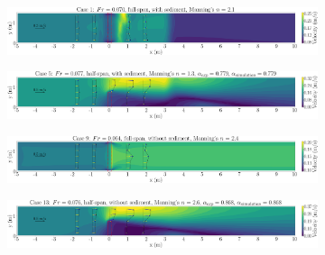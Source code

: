 \documentclass[preview, border=2pt]{standalone}
\begin{document}
\begin{figure}
     \centering
     \begin{subfigure}[b]{0.95\textwidth}
         \centering
         \caption{}
         \includegraphics[width=\textwidth]{exp_vel_mag_contour_ManningN_0001.png}
     \end{subfigure}
     \hfill     
     \begin{subfigure}[b]{0.95\textwidth}
         \centering
         \caption{}
         \includegraphics[width=\textwidth]{exp_vel_mag_contour_ManningN_0005.png}
     \end{subfigure}
     \hfill     
     \begin{subfigure}[b]{0.95\textwidth}
         \centering
         \caption{}
         \includegraphics[width=\textwidth]{exp_vel_mag_contour_ManningN_0009.png}
     \end{subfigure}
     \hfill     
     \begin{subfigure}[b]{0.95\textwidth}
         \centering
         \caption{}
         \includegraphics[width=\textwidth]{exp_vel_mag_contour_ManningN_0013.png}
     \end{subfigure}     
\end{figure}
\end{document}
